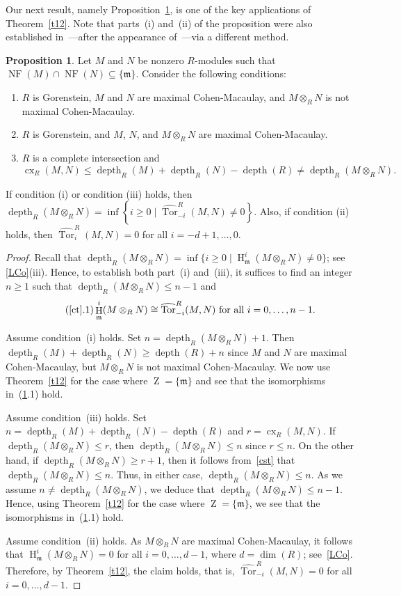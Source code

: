 \documentclass[11pt]{amsart}
\theoremstyle{definition}
\newtheorem{prop}[thm]{Proposition}
\theoremstyle{definition}
\numberwithin{equation}{section}
\newcommand{\fm}{\mathfrak{m}}
\DeclareMathOperator{\cx}{cx}
\DeclareMathOperator{\mz}{Z}
\DeclareMathOperator{\depth}{depth}
\DeclareMathOperator{\hh}{H}
\DeclareMathOperator{\Tor}{Tor}
\DeclareMathOperator{\NF}{NF}
\begin{document}
Our next result, namely Proposition~\ref{ct}, is one of the key applications of Theorem~\ref{t12}. Note that parts~(i) and~(ii) of the proposition were also established in~\cite{Fukano}---after the appearance of~\cite{AOM}---via a different method.

\begin{prop} \label{ct} Let $M$ and $N$ be nonzero $R$-modules such that $\NF(M)\cap\NF(N)\subseteq\{\fm\}$. Consider the following conditions:
\begin{enumerate}[\rm(i)]
\item $R$ is Gorenstein, $M$ and $N$ are maximal Cohen-Macaulay, and $M\otimes_RN$ is not maximal Cohen-Macaulay.
\item $R$ is Gorenstein, and $M$, $N$, and $M\otimes_RN$ are maximal Cohen-Macaulay.
\item $R$ is a complete intersection and $$\cx_R(M,N)\leq  \depth_R(M)+\depth_R(N)-\depth(R) \neq \depth_R(M\otimes_RN).$$
\end{enumerate}
If condition (i) or condition (iii) holds, then $\depth_R(M\otimes_RN)=\inf \left\{i\geq0\mid\widehat{\Tor}_{-i}^R(M,N)\neq0\right\}$. Also, if condition (ii) holds, then $\widehat{\Tor}_{i}^R(M,N)=0$ for all $i=-d+1, \ldots, 0$. 
\end{prop}

\begin{proof} Recall that $\depth_R(M\otimes_RN)=\inf\{i\geq0\mid\hh^i_{\fm}(M\otimes_RN)\neq0\}$; see \ref{LCo}(iii). Hence, to establish both part~(i) and~(iii), it suffices to find an integer $n\geq 1$ such that $\depth_R(M\otimes_RN)\leq n-1$ and 
\begin{equation}\tag{\ref{ct}.1}
\hh^i_{\fm}(M\otimes_RN)\cong\widehat{\Tor}_{-i}^R(M,N) \text{ for  all }  i=0, \ldots, n-1.
\end{equation}

Assume condition~(i) holds. Set $n=\depth_R(M\otimes_RN)+1$. Then $\depth_R(M)+\depth_R(N)\geq\depth(R)+n$ since $M$ and $N$ are maximal Cohen-Macaulay, but $M\otimes_RN$ is not maximal Cohen-Macaulay. We now use Theorem~\ref{t12} for the case where $\mz=\{\fm\}$ and see that the isomorphisms in~(\ref{ct}.1) hold.

Assume condition~(iii) holds. Set $n=\depth_R(M)+\depth_R(N)-\depth(R)$ and $r=\cx_R(M,N)$. If $\depth_R(M\otimes_RN)\leq r$, then $\depth_R(M\otimes_RN) \leq n$ since $r \leq n$. On the other hand, if $\depth_R(M\otimes_RN)\geq r+1$, then it follows from~\ref{cst} that $\depth_R(M\otimes_RN)\leq n$. Thus, in either case, $\depth_R(M\otimes_RN)\leq n$. As we assume $n \neq \depth_R(M\otimes_RN)$, we deduce that $\depth_R(M\otimes_RN)\leq n-1$. Hence, using Theorem~\ref{t12} for the case where $\mz=\{\fm\}$, we see that the isomorphisms in~(\ref{ct}.1) hold.

Assume condition~(ii) holds. As $M\otimes_RN$ are maximal Cohen-Macaulay, it follows that $\hh^i_{\fm}(M\otimes_RN)=0$ for all $i=0, \ldots, d-1$, where $d=\dim(R)$; see~\ref{LCo}. Therefore, by Theorem~\ref{t12}, the claim holds, that is, $\widehat{\Tor}_{-i}^R(M,N)=0$ for all $i=0, \ldots, d-1$. 
\end{proof}
\end{document}
